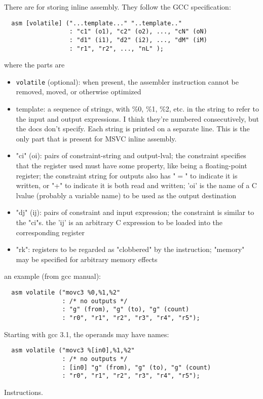 \documentclass[11pt]{article}
\begin{document}
\begin{ocamldoccomment}
There are for storing inline assembly. They follow the GCC 
 specification: 
\begin{verbatim}
  asm [volatile] ("...template..." "..template.."
                  : "c1" (o1), "c2" (o2), ..., "cN" (oN)
                  : "d1" (i1), "d2" (i2), ..., "dM" (iM)
                  : "r1", "r2", ..., "nL" );
\end{verbatim}


where the parts are

\begin{itemize}
\item {\tt{volatile}} (optional): when present, the assembler instruction
    cannot be removed, moved, or otherwise optimized
\item template: a sequence of strings, with \%0, \%1, \%2, etc. in the string to 
    refer to the input and output expressions. I think they're numbered
    consecutively, but the docs don't specify. Each string is printed on 
    a separate line. This is the only part that is present for MSVC inline
    assembly.
\item "ci" (oi): pairs of constraint-string and output-lval; the 
    constraint specifies that the register used must have some
    property, like being a floating-point register; the constraint
    string for outputs also has "$=$" to indicate it is written, or
    "+" to indicate it is both read and written; 'oi' is the
    name of a C lvalue (probably a variable name) to be used as
    the output destination
\item "dj" (ij): pairs of constraint and input expression; the constraint
    is similar to the "ci"s.  the 'ij' is an arbitrary C expression
    to be loaded into the corresponding register
\item "rk": registers to be regarded as "clobbered" by the instruction;
    "memory" may be specified for arbitrary memory effects
\end{itemize}

an example (from gcc manual):
\begin{verbatim}
  asm volatile ("movc3 %0,%1,%2"
                : /* no outputs */
                : "g" (from), "g" (to), "g" (count)
                : "r0", "r1", "r2", "r3", "r4", "r5");
\end{verbatim}


 Starting with gcc 3.1, the operands may have names:


\begin{verbatim}
  asm volatile ("movc3 %[in0],%1,%2"
                : /* no outputs */
                : [in0] "g" (from), "g" (to), "g" (count)
                : "r0", "r1", "r2", "r3", "r4", "r5");
\end{verbatim}
\end{ocamldoccomment}
\begin{ocamldocdescription}
Instructions.


\end{ocamldocdescription}
\end{document}

